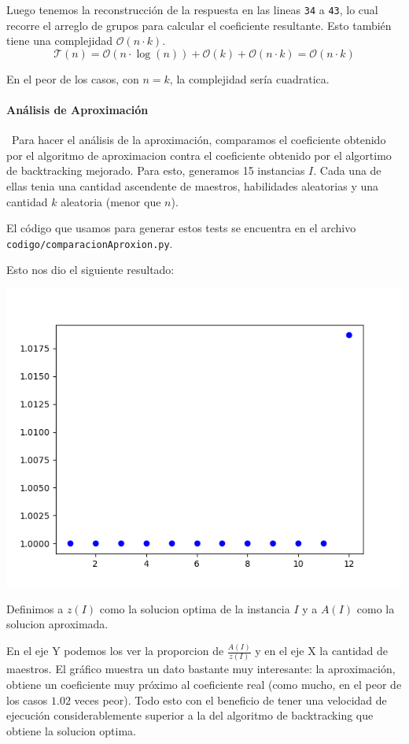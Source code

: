 \documentclass{article}
\begin{document}
Luego tenemos la reconstrucción de la respuesta en las lineas \texttt{34} a \texttt{43}, lo cual recorre el arreglo de grupos para calcular el coeficiente resultante. Esto también tiene una complejidad $\mathcal{O}(n \cdot k)$.
$$
\mathcal{T}(n) = \mathcal{O}(n \cdot \log (n)) + \mathcal{O}(k) + \mathcal{O}(n \cdot k) = \mathcal{O}(n \cdot k)
$$

En el peor de los casos, con $n = k$, la complejidad sería cuadratica.

\paragraph{Análisis de Aproximación} \
Para hacer el análisis de la aproximación, comparamos el coeficiente obtenido por el algoritmo de aproximacion contra el coeficiente obtenido por el algortimo de backtracking mejorado.
Para esto, generamos 15 instancias $I$. Cada una de ellas tenia una cantidad ascendente de maestros, habilidades aleatorias y una cantidad $k$ aleatoria (menor que $n$).

El código que usamos para generar estos tests se encuentra en el archivo \texttt{codigo/comparacionAproxion.py}.

Esto nos dio el siguiente resultado: 

\includegraphics[scale=0.60]{images/coeficientesAprox.png}

Definimos a $z(I)$ como la solucion optima de la instancia $I$ y a $A(I)$ como la solucion aproximada.

En el eje Y podemos los ver la proporcion de $\frac{A(I)}{z(I)}$ y en el eje X la cantidad de maestros.
El gráfico muestra un dato bastante muy interesante: la aproximación, obtiene un coeficiente muy próximo al coeficiente real (como mucho, en el peor de los casos $1.02$ veces peor). Todo esto con el beneficio de tener una velocidad de ejecución considerablemente superior a la del algoritmo de backtracking que obtiene la solucion optima.
\end{document}
